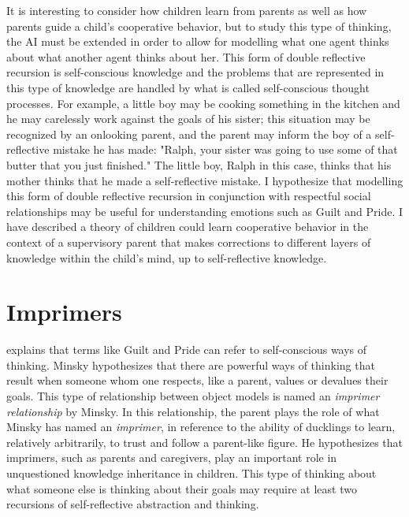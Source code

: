 It is interesting to consider how children learn from parents as well
as how parents guide a child's cooperative behavior, but to study this
type of thinking, the AI must be extended in order to allow for
modelling what one agent thinks about what another agent thinks about
her.  This form of double reflective recursion is self-conscious
knowledge and the problems that are represented in this type of
knowledge are handled by what is called self-conscious thought
processes. For example, a little boy may be cooking something in the
kitchen and he may carelessly work against the goals of his sister;
this situation may be recognized by an onlooking parent, and the
parent may inform the boy of a self-reflective mistake he has made:
"Ralph, your sister was going to use some of that butter that you just
finished." The little boy, Ralph in this case, thinks that his mother
thinks that he made a self-reflective mistake. I hypothesize that
modelling this form of double reflective recursion in conjunction with
respectful social relationships may be useful for understanding
emotions such as Guilt and Pride.  I have described
\cite[]{morgan:2010} a theory of children could learn cooperative
behavior in the context of a supervisory parent that makes corrections
to different layers of knowledge within the child's mind, up to
self-reflective knowledge.

\section{Imprimers}

\cite{minsky:2006} explains that terms like Guilt and Pride can refer
to self-conscious ways of thinking.  Minsky hypothesizes that there
are powerful ways of thinking that result when someone whom one
respects, like a parent, values or devalues their goals.  This type of
relationship between object models is named an \emph{imprimer
  relationship} by Minsky.  In this relationship, the parent plays the
role of what Minsky has named an \emph{imprimer}, in reference to the
ability of ducklings to learn, relatively arbitrarily, to trust and
follow a parent-like figure.  He hypothesizes that imprimers, such as
parents and caregivers, play an important role in unquestioned
knowledge inheritance in children.  This type of thinking about what
someone else is thinking about their goals may require at least two
recursions of self-reflective abstraction and thinking.

